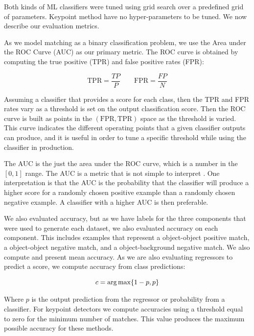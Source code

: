 Both kinds of ML classifiers were tuned using grid search over a predefined grid of parameters. Keypoint method have no hyper-parameters to be tuned. We now describe our evaluation metrics.

As we model matching as a binary classification problem, we use the Area under the ROC Curve (AUC) as our primary metric. The ROC curve is obtained by computing the true positive (TPR) and false positive rates (FPR):

\begin{equation}
	\text{TPR} = \frac{TP}{P} \qquad \text{FPR} = \frac{FP}{N}
\end{equation}

Assuming a classifier that provides a score for each class, then the TPR and FPR rates vary as a threshold is set on the output classification score. Then the ROC curve is built as points in the $(\text{FPR}, \text{TPR})$ space as the threshold is varied. This curve indicates the different operating points that a given classifier outputs can produce, and it is useful in order to tune a specific threshold while using the classifier in production.

The AUC is the just the area under the ROC curve, which is a number in the $[0, 1]$ range. The AUC is a metric that is not simple to interpret \cite{sammut2011encyclopedia}. One interpretation is that the AUC is the probability that the classifier will produce a higher score for a randomly chosen positive example than a randomly chosen negative example. A classifier with a higher AUC is then preferable.

We also evaluated accuracy, but as we have labels for the three components that were used to generate each dataset, we also evaluated accuracy on each component. This includes examples that represent a object-object positive match, a object-object negative match, and a object-background negative match. We also compute and present mean accuracy. As we are also evaluating regressors to predict a score, we compute accuracy from class predictions:

\begin{equation}
	c = \operatorname*{arg\,max}\{1 - p, p\}
\end{equation}

Where $p$ is the output prediction from the regressor or probability from a classifier. For keypoint detectors we compute accuracies using a threshold equal to zero for the minimum number of matches. This value produces the maximum possible accuracy for these methods.

